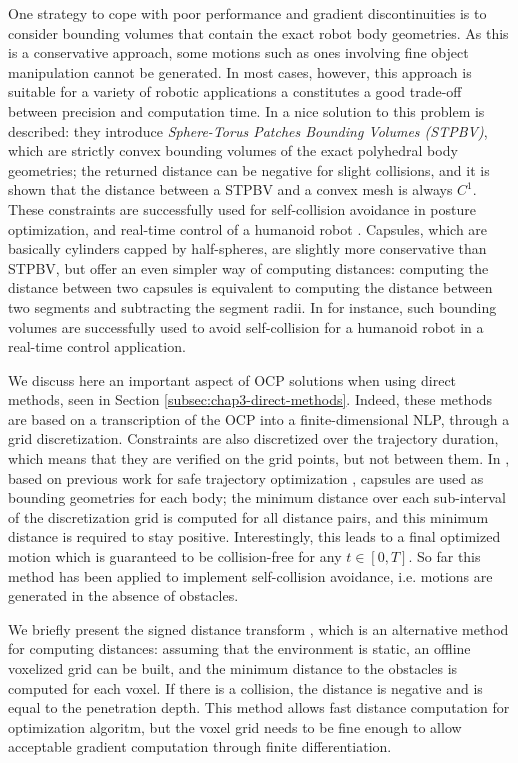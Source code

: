 One strategy to cope with poor performance and gradient
discontinuities is to consider bounding volumes that contain the exact
robot body geometries. As this is a conservative approach, some
motions such as ones involving fine object manipulation cannot be
generated. In most cases, however, this approach is suitable for a
variety of robotic applications a constitutes a good trade-off between
precision and computation time. In \cite{Escande2007} a nice solution
to this problem is described: they introduce \emph{Sphere-Torus
  Patches Bounding Volumes (STPBV)}, which are strictly convex
bounding volumes of the exact polyhedral body geometries; the returned
distance can be negative for slight collisions, and it is shown that
the distance between a STPBV and a convex mesh is always $C^1$. These
constraints are successfully used for self-collision avoidance in
posture optimization, and real-time control of a humanoid robot
\cite{Stasse2008}. Capsules, which are basically cylinders capped by
half-spheres, are slightly more conservative than STPBV, but offer an
even simpler way of computing distances: computing the distance
between two capsules is equivalent to computing the distance between
two segments and subtracting the segment radii. In \cite{Kanoun2011}
for instance, such bounding volumes are successfully used to avoid
self-collision for a humanoid robot in a real-time control
application.

We discuss here an important aspect of OCP solutions when using direct
methods, seen in Section \ref{subsec:chap3-direct-methods}. Indeed,
these methods are based on a transcription of the OCP into a
finite-dimensional NLP, through a grid discretization. Constraints are
also discretized over the trajectory duration, which means that they
are verified on the grid points, but not between them. In
\cite{lee2012accurate}, based on previous work for safe trajectory
optimization \cite{Lengagne2010}, capsules are used as bounding
geometries for each body; the minimum distance over each sub-interval
of the discretization grid is computed for all distance pairs, and
this minimum distance is required to stay positive. Interestingly,
this leads to a final optimized motion which is guaranteed to be
collision-free for any $t\in[0,T]$. So far this method has been
applied to implement self-collision avoidance, i.e. motions are
generated in the absence of obstacles.

We briefly present the signed distance transform
\cite{felzenszwalb2004distance}, which is an alternative method for
computing distances: assuming that the environment is static, an
offline voxelized grid can be built, and the minimum distance to the
obstacles is computed for each voxel. If there is a collision, the
distance is negative and is equal to the penetration depth. This
method allows fast distance computation for optimization algoritm, but
the voxel grid needs to be fine enough to allow acceptable gradient
computation through finite differentiation.

